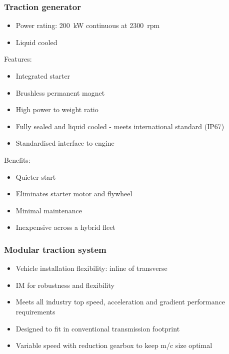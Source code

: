 \subsubsection{Traction generator}
\begin{itemize}
    \item Power rating: \SI{200}{\kilo\watt} continuous at \SI{2300}{rpm}
    \item Liquid cooled
\end{itemize}
Features:
\begin{itemize}
    \item Integrated starter
    \item Brushless permanent magnet
    \item High power to weight ratio
    \item Fully sealed and liquid cooled - meets international standard (IP67)
    \item Standardised interface to engine
\end{itemize}
Benefits:
\begin{itemize}
    \item Quieter start
    \item Eliminates starter motor and flywheel
    \item Minimal maintenance
    \item Inexpensive across a hybrid fleet
\end{itemize}
\subsubsection{Modular traction system}
\begin{itemize}
    \item Vehicle installation flexibility: inline of transverse
    \item IM for robustness and flexibility
    \item Meets all industry top speed, acceleration and gradient performance requirements
    \item Designed to fit in conventional transmission footprint
    \item Variable speed with reduction gearbox to keep m/c size optimal
\end{itemize}
